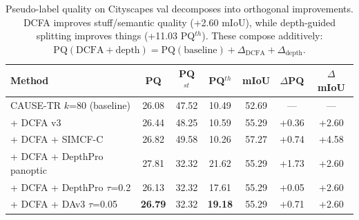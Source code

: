 
\begin{table}[t]
\centering
\small
\caption{Pseudo-label quality on Cityscapes val decomposes into orthogonal improvements. DCFA improves stuff/semantic quality (+2.60 mIoU), while depth-guided splitting improves things (+11.03 PQ$^{th}$). These compose additively: $\text{PQ}(\text{DCFA}+\text{depth}) = \text{PQ}(\text{baseline}) + \Delta_{\text{DCFA}} + \Delta_{\text{depth}}$.}
\label{tab:pseudolabel-composition-val}
\begin{tabular}{@{}lcccccc@{}}
\toprule
Method & PQ & PQ$^{st}$ & PQ$^{th}$ & mIoU & $\Delta$PQ & $\Delta$mIoU \\
\midrule
CAUSE-TR $k$=80 (baseline) & 26.08 & 47.52 & 10.49 & 52.69 & --- & --- \\
+ DCFA v3 & 26.44 & 48.25 & 10.59 & 55.29 & +0.36 & +2.60 \\
+ DCFA + SIMCF-C & 26.82 & 49.58 & 10.26 & 57.27 & +0.74 & +4.58 \\
\midrule
+ DCFA + DepthPro panoptic & 27.81 & 32.32 & 21.62 & 55.29 & +1.73 & +2.60 \\
+ DCFA + DepthPro $\tau$=0.2 & 26.13 & 32.32 & 17.61 & 55.29 & +0.05 & +2.60 \\
+ DCFA + DAv3 $\tau$=0.05 & \textbf{26.79} & 32.32 & \textbf{19.18} & 55.29 & +0.71 & +2.60 \\
\bottomrule
\end{tabular}
\end{table}

